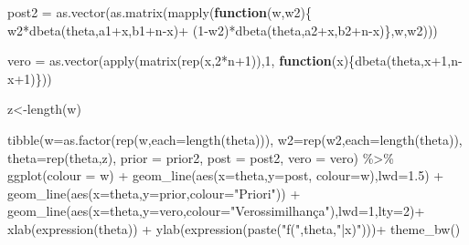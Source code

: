 \documentclass[
]{book}
\newenvironment{Shaded}{\begin{snugshade}}{\end{snugshade}}
\newcommand{\AttributeTok}[1]{\textcolor[rgb]{0.77,0.63,0.00}{#1}}
\newcommand{\ControlFlowTok}[1]{\textcolor[rgb]{0.13,0.29,0.53}{\textbf{#1}}}
\newcommand{\DecValTok}[1]{\textcolor[rgb]{0.00,0.00,0.81}{#1}}
\newcommand{\FloatTok}[1]{\textcolor[rgb]{0.00,0.00,0.81}{#1}}
\newcommand{\FunctionTok}[1]{\textcolor[rgb]{0.00,0.00,0.00}{#1}}
\newcommand{\NormalTok}[1]{#1}
\newcommand{\OtherTok}[1]{\textcolor[rgb]{0.56,0.35,0.01}{#1}}
\newcommand{\SpecialCharTok}[1]{\textcolor[rgb]{0.00,0.00,0.00}{#1}}
\newcommand{\StringTok}[1]{\textcolor[rgb]{0.31,0.60,0.02}{#1}}
\begin{document}
\begin{Shaded}
\begin{Highlighting}[]
\NormalTok{post2 }\OtherTok{=} \FunctionTok{as.vector}\NormalTok{(}\FunctionTok{as.matrix}\NormalTok{(}\FunctionTok{mapply}\NormalTok{(}\ControlFlowTok{function}\NormalTok{(w,w2)\{}
\NormalTok{  w2}\SpecialCharTok{*}\FunctionTok{dbeta}\NormalTok{(theta,a1}\SpecialCharTok{+}\NormalTok{x,b1}\SpecialCharTok{+}\NormalTok{n}\SpecialCharTok{{-}}\NormalTok{x)}\SpecialCharTok{+}
\NormalTok{  (}\DecValTok{1}\SpecialCharTok{{-}}\NormalTok{w2)}\SpecialCharTok{*}\FunctionTok{dbeta}\NormalTok{(theta,a2}\SpecialCharTok{+}\NormalTok{x,b2}\SpecialCharTok{+}\NormalTok{n}\SpecialCharTok{{-}}\NormalTok{x)\},w,w2)))}

\NormalTok{vero }\OtherTok{=} \FunctionTok{as.vector}\NormalTok{(}\FunctionTok{apply}\NormalTok{(}\FunctionTok{matrix}\NormalTok{(}\FunctionTok{rep}\NormalTok{(x,}\DecValTok{2}\SpecialCharTok{*}\NormalTok{n}\SpecialCharTok{+}\DecValTok{1}\NormalTok{)),}\DecValTok{1}\NormalTok{,}
  \ControlFlowTok{function}\NormalTok{(x)\{}\FunctionTok{dbeta}\NormalTok{(theta,x}\SpecialCharTok{+}\DecValTok{1}\NormalTok{,n}\SpecialCharTok{{-}}\NormalTok{x}\SpecialCharTok{+}\DecValTok{1}\NormalTok{)\}))}

\NormalTok{z}\OtherTok{\textless{}{-}}\FunctionTok{length}\NormalTok{(w)}

\FunctionTok{tibble}\NormalTok{(}\AttributeTok{w=}\FunctionTok{as.factor}\NormalTok{(}\FunctionTok{rep}\NormalTok{(w,}\AttributeTok{each=}\FunctionTok{length}\NormalTok{(theta))),}
    \AttributeTok{w2=}\FunctionTok{rep}\NormalTok{(w2,}\AttributeTok{each=}\FunctionTok{length}\NormalTok{(theta)),}
    \AttributeTok{theta=}\FunctionTok{rep}\NormalTok{(theta,z), }\AttributeTok{prior =}\NormalTok{ prior2, }
    \AttributeTok{post =}\NormalTok{ post2, }\AttributeTok{vero =}\NormalTok{ vero) }\SpecialCharTok{\%\textgreater{}\%} 
  \FunctionTok{ggplot}\NormalTok{(}\AttributeTok{colour =}\NormalTok{ w) }\SpecialCharTok{+} 
  \FunctionTok{geom\_line}\NormalTok{(}\FunctionTok{aes}\NormalTok{(}\AttributeTok{x=}\NormalTok{theta,}\AttributeTok{y=}\NormalTok{post, }\AttributeTok{colour=}\NormalTok{w),}\AttributeTok{lwd=}\FloatTok{1.5}\NormalTok{) }\SpecialCharTok{+} 
  \FunctionTok{geom\_line}\NormalTok{(}\FunctionTok{aes}\NormalTok{(}\AttributeTok{x=}\NormalTok{theta,}\AttributeTok{y=}\NormalTok{prior,}\AttributeTok{colour=}\StringTok{"Priori"}\NormalTok{)) }\SpecialCharTok{+}
  \FunctionTok{geom\_line}\NormalTok{(}\FunctionTok{aes}\NormalTok{(}\AttributeTok{x=}\NormalTok{theta,}\AttributeTok{y=}\NormalTok{vero,}\AttributeTok{colour=}\StringTok{"Verossimilhança"}\NormalTok{),}\AttributeTok{lwd=}\DecValTok{1}\NormalTok{,}\AttributeTok{lty=}\DecValTok{2}\NormalTok{)}\SpecialCharTok{+}
  \FunctionTok{xlab}\NormalTok{(}\FunctionTok{expression}\NormalTok{(theta)) }\SpecialCharTok{+} \FunctionTok{ylab}\NormalTok{(}\FunctionTok{expression}\NormalTok{(}\FunctionTok{paste}\NormalTok{(}\StringTok{"f("}\NormalTok{,theta,}\StringTok{"|x)"}\NormalTok{)))}\SpecialCharTok{+}
  \FunctionTok{theme\_bw}\NormalTok{()}
\end{Highlighting}
\end{Shaded}
\end{document}
